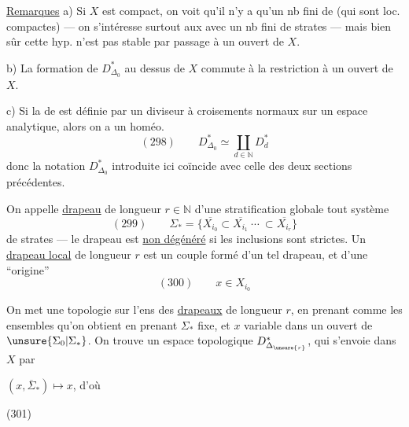
\uline{Remarques} a) Si $X$ est compact, on voit qu'il n'y a qu'un nb fini de   (qui sont loc. compactes) --- on s'intéresse surtout aux   avec un nb fini de strates --- mais bien sûr cette hyp. n'est pas stable par passage à un ouvert de $X$.

b) La formation de $D_{\Delta_0}^{*}$ au dessus de $X$ commute à la restriction à un ouvert de $X$.

c) Si la   de  est définie par un diviseur à croisements normaux sur un espace analytique, alors on a un homéo.
\[
(298)\qquad D_{\Delta_0}^{*}\simeq\coprod_{d\in\mathbb N}D_d^{*}
\]
donc la notation $D_{\Delta_0}^{*}$ introduite ici coïncide avec celle des  deux sections précédentes.



On appelle \uline{drapeau} de longueur $r\in\mathbb N$ d'une stratification globale tout système
\[
(299)\qquad \Sigma_*=\{\overline{X_{i_0}}\subset\overline{X_{i_1}}\ \cdots\ \subset\overline{X_{i_r}}\}
\]
de strates --- le drapeau est \uline{non dégénéré} si les inclusions sont strictes.
Un \uline{drapeau local}  de longueur $r$ est un  couple formé d'un tel drapeau, et d'une ``origine'' 
\[
(300)\qquad x\in X_{i_0}
\]

On met une topologie sur l'ens des \uline{drapeaux}  de  longueur $r$, en prenant comme   les ensembles qu'on obtient en prenant $\Sigma_*$ fixe, et $x$ variable dans un ouvert de $\unsure{\Sigma_0|\Sigma_*}$.
On trouve un espace topologique $D_{\Delta_{\unsure{r}}}^{*}$, qui s'envoie dans $X$ par



$(x,\overline{\Sigma}_*)\longmapsto x$, d'où

(301)\quad{}

